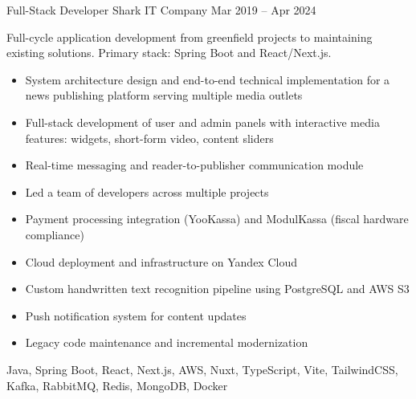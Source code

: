 \begin{works}
    \work
        {Full-Stack Developer} {Shark IT Company} {} {Mar 2019 -- Apr 2024}
        {
            Full-cycle application development from greenfield projects to maintaining existing solutions. Primary stack: Spring Boot and React/Next.js.
        \begin{itemize}
            \item {System architecture design and end-to-end technical implementation for a news publishing platform serving multiple media outlets}
            \item {Full-stack development of user and admin panels with interactive media features: widgets, short-form video, content sliders}
            \item {Real-time messaging and reader-to-publisher communication module}
            \item {Led a team of developers across multiple projects}
            \item {Payment processing integration (YooKassa) and ModulKassa (fiscal hardware compliance)}
            \item {Cloud deployment and infrastructure on Yandex Cloud}
            \item {Custom handwritten text recognition pipeline using PostgreSQL and AWS S3}
            \item {Push notification system for content updates}
            \item {Legacy code maintenance and incremental modernization}
        \end{itemize}
        }
        {
            Java, Spring Boot, React, Next.js, AWS, Nuxt, TypeScript, Vite, TailwindCSS, Kafka, RabbitMQ, Redis, MongoDB, Docker
        }
\end{works}

